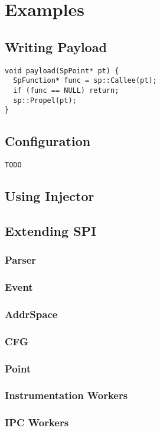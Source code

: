 \section{Examples}
\subsection{Writing Payload}

\lstset{numbers=left}
\begin{lstlisting}[caption=Writing Payload]
void payload(SpPoint* pt) {
  SpFunction* func = sp::Callee(pt);
  if (func == NULL) return;
  sp::Propel(pt);
}
\end{lstlisting}

\subsection{Configuration}
\lstset{numbers=left}
\begin{lstlisting}[caption=Configuration]
TODO
\end{lstlisting}

\subsection{Using Injector}

\subsection{Extending SPI}
\subsubsection{Parser}
\subsubsection{Event}
\subsubsection{AddrSpace}
\subsubsection{CFG}
\subsubsection{Point}
\subsubsection{Instrumentation Workers}
\subsubsection{IPC Workers}
